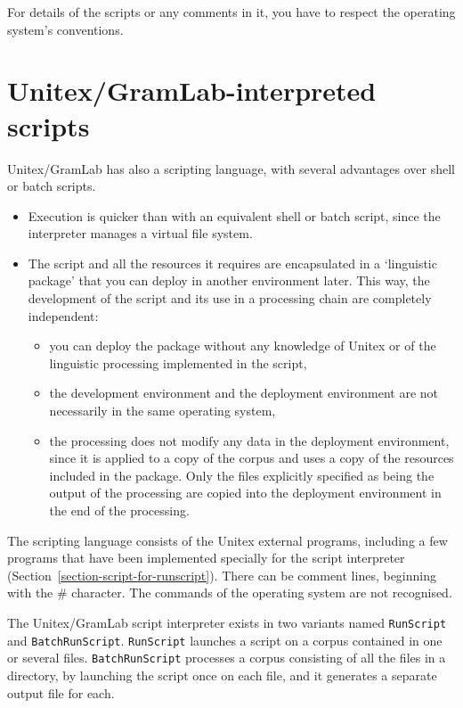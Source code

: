 \noindent For details of the scripts or any comments in it, you have to respect the operating system's
 conventions.



\section{Unitex/GramLab-interpreted scripts}
\label{section-unitex-scripts}

Unitex/GramLab has also a scripting language, with several advantages over shell or batch
scripts.
\begin{itemize}
    \item Execution is quicker than with an equivalent shell or batch script, since the interpreter manages a
virtual file system.
    \item The script and all the resources it requires are encapsulated in a `linguistic package'
    that you can deploy in another environment later. This way, the development of the script and its
    use in a processing chain are completely independent:
\begin{itemize}
    \item you can deploy the package without any knowledge of Unitex or of the linguistic processing
    implemented in the script,
    \item the development environment and the deployment environment are not necessarily
    in the same operating system,
    \item the processing does not modify any data in the deployment environment, since it is applied
    to a copy of the corpus and uses a copy of the resources included in the package. Only the files
explicitly specified as being the output of the processing are copied into the deployment environment in the end 
of the processing.
\end{itemize}
\end{itemize}

\noindent The scripting language consists of the Unitex external programs, including
a few programs that have been implemented specially for the script interpreter 
(Section~\ref{section-script-for-runscript}). There can be comment lines, beginning with 
the  \# character. The commands of the operating system are not recognised.

\bigskip{}
\noindent The Unitex/GramLab script interpreter exists in two variants named \verb$RunScript$ and
\verb$BatchRunScript$. \verb$RunScript$ launches a script on a corpus contained in one or several files.
\verb$BatchRunScript$ processes a corpus consisting of all the files in a directory,
by launching the script once on each file, and it generates a separate output file for each.




